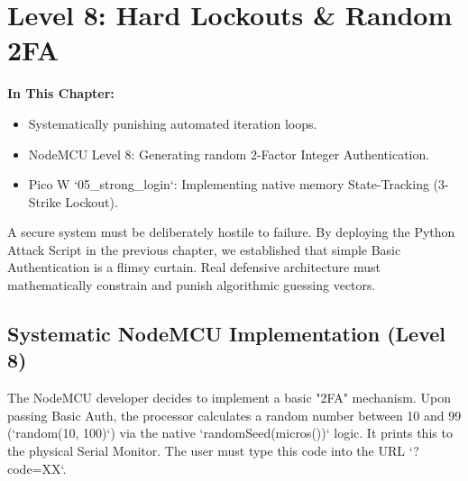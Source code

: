 \chapter{Level 8: Hard Lockouts \& Random 2FA}

\textbf{In This Chapter:}
\begin{itemize}
    \item Systematically punishing automated iteration loops.
    \item NodeMCU Level 8: Generating random 2-Factor Integer Authentication.
    \item Pico W `05\_strong\_login`: Implementing native memory State-Tracking (3-Strike Lockout).
\end{itemize}

A secure system must be deliberately hostile to failure. By deploying the Python Attack Script in the previous chapter, we established that simple Basic Authentication is a flimsy curtain. Real defensive architecture must mathematically constrain and punish algorithmic guessing vectors.

\section{Systematic NodeMCU Implementation (Level 8)}
The NodeMCU developer decides to implement a basic "2FA" mechanism. Upon passing Basic Auth, the processor calculates a random number between 10 and 99 (`random(10, 100)`) via the native `randomSeed(micros())` logic. It prints this to the physical Serial Monitor. The user must type this code into the URL `?code=XX`.

